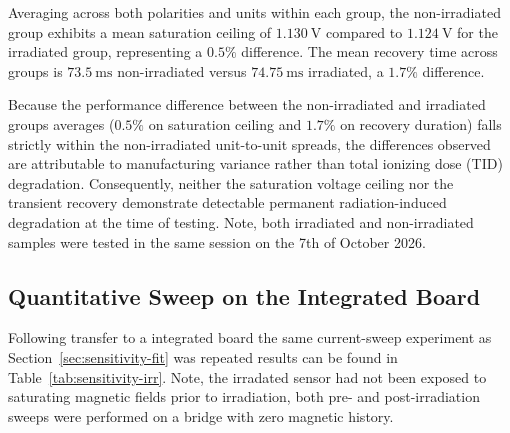 \documentclass[12pt,a4paper]{article}
\begin{document}
Averaging across both polarities and units within each group, the non-irradiated group exhibits a mean saturation ceiling of $\SI{1.130}{\volt}$ compared to $\SI{1.124}{\volt}$ for the irradiated group, representing a $0.5\%$ difference. The mean recovery time across groups is $\SI{73.5}{\milli\second}$ non-irradiated versus $\SI{74.75}{\milli\second}$ irradiated, a $1.7\%$ difference.

Because the performance difference between the non-irradiated and irradiated groups averages ($0.5\%$ on saturation ceiling and $1.7\%$ on recovery duration) falls strictly within the non-irradiated unit-to-unit spreads, the differences observed are attributable to manufacturing variance rather than total ionizing dose (TID) degradation. Consequently, neither the saturation voltage ceiling nor the transient recovery demonstrate detectable permanent radiation-induced degradation at the time of testing. Note, both irradiated and non-irradiated samples were tested in the same session on the 7th of October 2026.


\subsection{Quantitative Sweep on the Integrated Board}
\label{sec:rad-sweep}

Following transfer to a integrated board the same current-sweep experiment as Section~\ref{sec:sensitivity-fit} was repeated results can be found in Table~\ref{tab:sensitivity-irr}. Note, the irradated sensor had not been exposed to saturating magnetic fields prior to irradiation, both pre- and post-irradiation sweeps were performed on a bridge with zero magnetic history. 
\end{document}
